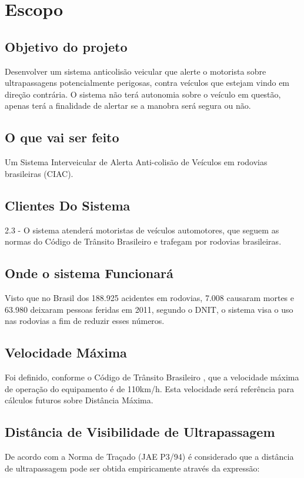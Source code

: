 \chapter[Escopo]{Escopo}

\section{Objetivo do projeto}
Desenvolver um sistema anticolisão veicular que alerte o motorista sobre ultrapassagens potencialmente
perigosas, contra veículos que estejam vindo em direção contrária.
O sistema não terá autonomia sobre o veículo em questão, apenas terá a finalidade de alertar se a manobra
será segura ou não.

\section{O que vai ser feito}
Um Sistema Interveicular de Alerta Anti-colisão de Veículos em rodovias brasileiras (CIAC).

\section{Clientes Do Sistema}
2.3 - O sistema atenderá motoristas de veículos automotores, que seguem as normas do Código de Trânsito
Brasileiro e trafegam por rodovias brasileiras.
\section{Onde o sistema Funcionará}
Visto que no Brasil dos 188.925 acidentes em rodovias, 7.008 causaram mortes e 63.980 deixaram pessoas
feridas em 2011, segundo o DNIT, o sistema visa o uso nas rodovias a fim de reduzir esses números. \cite{ministerio}

\section{Velocidade Máxima}
Foi definido, conforme o Código de Trânsito Brasileiro \cite{ctb}, que a velocidade máxima de operação
 do equipamento é de 110km/h.
Esta velocidade será referência para cálculos futuros sobre Distância Máxima.

\section{Distância de Visibilidade de Ultrapassagem}
De acordo com a Norma de Traçado (JAE P3/94) é considerado que a distância  de ultrapassagem pode ser
obtida empiricamente através da expressão:

